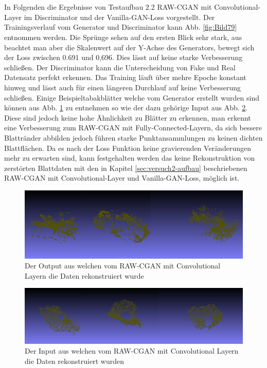 \documentclass{llncs}
\begin{document}
\newpage
~\\\\
In Folgenden die Ergebnisse von Testaufbau 2.2 RAW-CGAN mit Convolutional-Layer im Discriminator und der Vanilla-GAN-Loss vorgestellt. Der Trainingsverlauf vom Generator und Discriminator kann Abb. \ref{fig:Bild79} entnommen werden. Die Sprünge sehen auf den ersten Blick sehr stark, aus beachtet man aber die Skalenwert auf der Y-Achse des Generators, bewegt sich der Loss zwischen 0.691 und 0,696. Dies lässt auf keine starke Verbesserung schließen. Der Discriminator kann die Unterscheidung von Fake und Real Datensatz perfekt erkennen. Das Training läuft über mehre Epoche konstant hinweg und lässt auch für einen längeren Durchlauf auf keine Verbesserung schließen. Einige Beispieltabakblätter welche vom Generator erstellt wurden sind können aus Abb. \ref{fig:Bild80} zu entnehmen so wie der dazu gehörige Input aus Abb. \ref{fig:Bild78}. Diese sind jedoch keine hohe Ähnlichkeit zu Blätter zu erkennen, man erkennt eine Verbesserung zum RAW-CGAN mit Fully-Connected-Layern, da sich bessere Blattränder abbilden jedoch führen starke Punktansammlungen zu keinen dichten Blattflächen. Da es nach der Loss Funktion keine gravierenden Veränderungen mehr zu erwarten sind, kann festgehalten werden das keine Rekonstruktion von zerstörten Blattdaten mit den in Kapitel \ref{sec:versuch2-aufbau} beschriebenen RAW-CGAN mit Convolutional-Layer und Vanilla-GAN-Loss, möglich ist.
\begin{figure}[htbp] 
	\centering
	\includegraphics[width=1.0\textwidth]{dcpgan_ws_fake.png}
	\caption{Der Output aus welchen vom RAW-CGAN mit Convolutional Layern die Daten rekonstruiert wurde}
	\label{fig:Bild80}
\end{figure}
\begin{figure}[htbp] 
	\centering
	\includegraphics[width=1.0\textwidth]{dc_pgan_ws_real.png}
	\caption{Der Input aus welchen vom RAW-CGAN mit Convolutional Layern die Daten rekonstruiert wurden}
	\label{fig:Bild78}
\end{figure}
\end{document}
